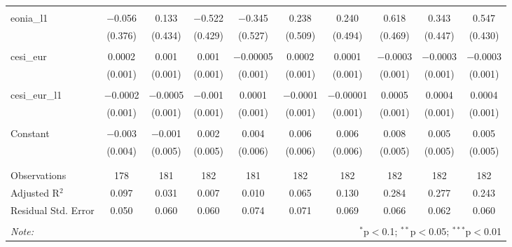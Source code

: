 \begin{table}[!htbp]
\begin{adjustbox}{width=1.35\textwidth}
\begin{tabular}{@{\extracolsep{5pt}}lccccccccc}
  & & & & & & & & & \\ 
 eonia\_l1 & $-$0.056 & 0.133 & $-$0.522 & $-$0.345 & 0.238 & 0.240 & 0.618 & 0.343 & 0.547 \\ 
  & (0.376) & (0.434) & (0.429) & (0.527) & (0.509) & (0.494) & (0.469) & (0.447) & (0.430) \\ 
  & & & & & & & & & \\ 
 cesi\_eur & 0.0002 & 0.001 & 0.001 & $-$0.00005 & 0.0002 & 0.0001 & $-$0.0003 & $-$0.0003 & $-$0.0003 \\ 
  & (0.001) & (0.001) & (0.001) & (0.001) & (0.001) & (0.001) & (0.001) & (0.001) & (0.001) \\ 
  & & & & & & & & & \\ 
 cesi\_eur\_l1 & $-$0.0002 & $-$0.0005 & $-$0.001 & 0.0001 & $-$0.0001 & $-$0.00001 & 0.0005 & 0.0004 & 0.0004 \\ 
  & (0.001) & (0.001) & (0.001) & (0.001) & (0.001) & (0.001) & (0.001) & (0.001) & (0.001) \\ 
  & & & & & & & & & \\ 
 Constant & $-$0.003 & $-$0.001 & 0.002 & 0.004 & 0.006 & 0.006 & 0.008 & 0.005 & 0.005 \\ 
  & (0.004) & (0.005) & (0.005) & (0.006) & (0.006) & (0.006) & (0.005) & (0.005) & (0.005) \\ 
  & & & & & & & & & \\ 
\hline \\[-1.8ex] 
Observations & 178 & 181 & 182 & 181 & 182 & 182 & 182 & 182 & 182 \\ 
Adjusted R$^{2}$ & 0.097 & 0.031 & 0.007 & 0.010 & 0.065 & 0.130 & 0.284 & 0.277 & 0.243 \\ 
Residual Std. Error & 0.050 & 0.060 & 0.060 & 0.074 & 0.071 & 0.069 & 0.066 & 0.062 & 0.060 \\ 
\hline 
\hline \\[-1.8ex] 
\textit{Note:}  & \multicolumn{9}{r}{$^{*}$p$<$0.1; $^{**}$p$<$0.05; $^{***}$p$<$0.01} \\ 
\end{tabular} 
\end{adjustbox}
\end{table} 
